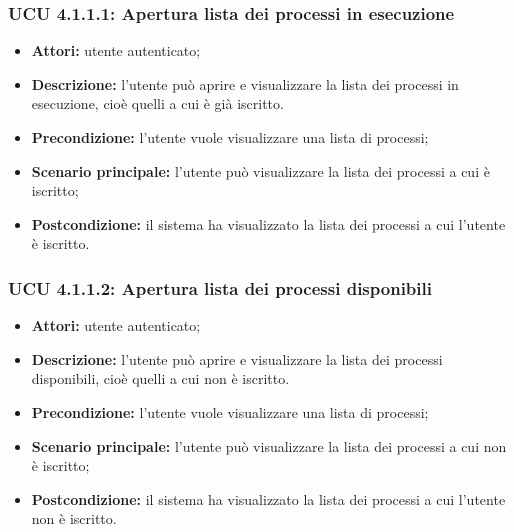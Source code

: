 \subsubsection{UCU 4.1.1.1: Apertura lista dei processi in esecuzione}
\begin{itemize}
\item \textbf{Attori:} utente autenticato;
\item \textbf{Descrizione:} l'utente può aprire e visualizzare la lista dei processi in esecuzione, cioè quelli a cui è già iscritto. 
\item \textbf{Precondizione:} l'utente vuole visualizzare una lista di processi;
\item \textbf{Scenario principale:} l'utente può visualizzare la lista dei processi a cui è iscritto;
\item \textbf{Postcondizione:} il sistema ha visualizzato la lista dei processi a cui l'utente è iscritto.
\end{itemize}

\subsubsection{UCU 4.1.1.2: Apertura lista dei processi disponibili}
\begin{itemize}
\item \textbf{Attori:} utente autenticato;
\item \textbf{Descrizione:} l'utente può aprire e visualizzare la lista dei processi disponibili, cioè quelli a cui non è iscritto. 
\item \textbf{Precondizione:} l'utente vuole visualizzare una lista di processi;
\item \textbf{Scenario principale:} l'utente può visualizzare la lista dei processi a cui non è iscritto;
\item \textbf{Postcondizione:} il sistema ha visualizzato la lista dei processi a cui l'utente non è iscritto.
\end{itemize}


